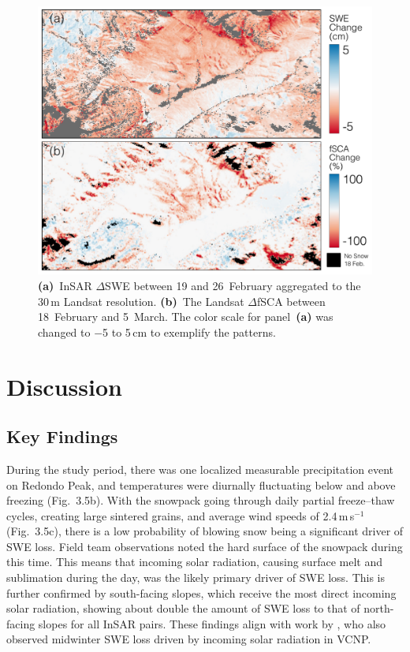 \begin{figure}[t]
\centering
\includegraphics[width=14cm]{figures/ch3_figs/fig12.pdf}
\caption{\textbf{(a)}~InSAR $\Delta$SWE between 19 and 26~February aggregated to the 30\,m Landsat resolution. \textbf{(b)}~The Landsat $\Delta$fSCA between 18~February and 5~March. The color scale for panel~\textbf{(a)} was changed to $-$5 to 5\,cm to exemplify the patterns.}
\end{figure}


\hypertarget{ch4-discussion}{\section{Discussion}\label{ch4-discussion}}
\hypertarget{ch4-discussion-1}{\subsection{Key Findings}\label{ch4-discussion-1}}



During the study period, there was one localized measurable precipitation event on Redondo Peak, and temperatures were diurnally fluctuating below and above freezing (Fig.~3.5b). With the snowpack going through daily partial freeze--thaw cycles, creating large sintered grains, and average wind speeds of 2.4\,m\,s$^{-1}$ (Fig.~3.5c), there is a low probability of blowing snow being a significant driver of SWE loss. Field team observations noted the hard surface of the snowpack during this time. This means that incoming solar radiation, causing surface melt and sublimation during the day, was the likely primary driver of SWE loss. This is further confirmed by south-facing slopes, which receive the most direct incoming solar radiation, showing about double the amount of SWE loss to that of north-facing slopes for all InSAR pairs. These findings align with work by \citet{musselmanEffectsVegetationSnow2008}, who also observed midwinter SWE loss driven by incoming solar radiation in VCNP.

